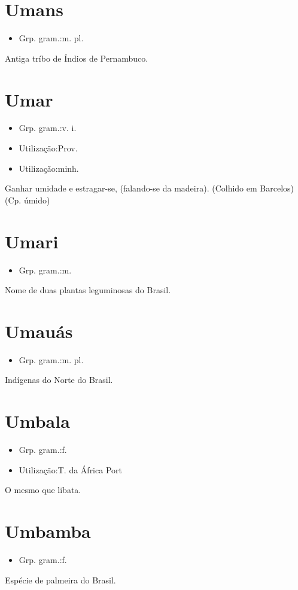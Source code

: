\documentclass{article}
\begin{document}
\section{Umans}
\begin{itemize}
\item {Grp. gram.:m. pl.}
\end{itemize}
Antiga tríbo de Índios de Pernambuco.
\section{Umar}
\begin{itemize}
\item {Grp. gram.:v. i.}
\end{itemize}
\begin{itemize}
\item {Utilização:Prov.}
\end{itemize}
\begin{itemize}
\item {Utilização:minh.}
\end{itemize}
Ganhar umidade e estragar-se, (falando-se da madeira). (Colhido em Barcelos)
(Cp. \textunderscore úmido\textunderscore )
\section{Umari}
\begin{itemize}
\item {Grp. gram.:m.}
\end{itemize}
Nome de duas plantas leguminosas do Brasil.
\section{Umauás}
\begin{itemize}
\item {Grp. gram.:m. pl.}
\end{itemize}
Indígenas do Norte do Brasil.
\section{Umbala}
\begin{itemize}
\item {Grp. gram.:f.}
\end{itemize}
\begin{itemize}
\item {Utilização:T. da África Port}
\end{itemize}
O mesmo que \textunderscore libata\textunderscore .
\section{Umbamba}
\begin{itemize}
\item {Grp. gram.:f.}
\end{itemize}
Espécie de palmeira do Brasil.
\end{document}
